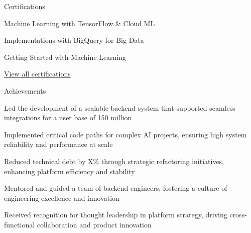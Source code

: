 \documentclass{resume} %
\begin{document}
    \begin{rSection}{Certifications}
        \begin{rSubsection}{}{}{}
                            \item Machine Learning with TensorFlow \& Cloud ML
                            \item Implementations with BigQuery for Big Data
                            \item Getting Started with Machine Learning
                    \end{rSubsection}
        \href{https://skillsoft.digitalbadges.skillsoft.com/profile/umairsaeed185770/wallet}{View all certifications}
    \end{rSection}

    \begin{rSection}{Achievements}
        \begin{rSubsection}{}{}{}
                            \item Led the development of a scalable backend system that supported seamless integrations for a user base of 150 million
                            \item Implemented critical code paths for complex AI projects, ensuring high system reliability and performance at scale
                            \item Reduced technical debt by X\% through strategic refactoring initiatives, enhancing platform efficiency and stability
                            \item Mentored and guided a team of backend engineers, fostering a culture of engineering excellence and innovation
                            \item Received recognition for thought leadership in platform strategy, driving cross{-}functional collaboration and product innovation
                    \end{rSubsection}
    \end{rSection}
\end{document}
